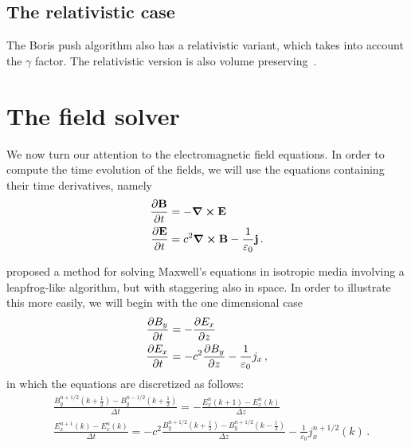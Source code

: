 \documentclass[12pt, class=report, crop=false]{standalone}
\begin{document}
\subsection{The relativistic case}

The Boris push algorithm also has a relativistic variant, which takes into account
the \(\gamma\) factor. The relativistic version is also volume
preserving~\autocite{higuera_structurepreservingsecondorder_2017}.

\section{The field solver}

We now turn our attention to the electromagnetic field equations. In order to
compute the time evolution of the fields, we will use the equations containing
their time derivatives, namely
\begin{align}
  \pdv{\vb{B}}{t} & = - \curl{\vb{E}} \label{eq:faraday-law-for-yee} \\
  \pdv{\vb{E}}{t} & = c^2 \curl{\vb{B}} - \frac{1}{\varepsilon_0} \vb{j} \label{eq:ampere-law-for-yee}\,.
\end{align}

\Textcite{kaneyee_numericalsolution_1966} proposed a method for solving Maxwell's
equations in isotropic media involving a leapfrog-like algorithm, but with
staggering also in space. In order to illustrate this more easily, we will begin
with the one dimensional case
\begin{align*}
  \pdv{B_y}{t} & = - \pdv{E_x}{z} \\
  \pdv{E_x}{t} & = -c^2 \pdv{B_y}{z} - \frac{1}{\varepsilon_0} j_x \,,
\end{align*}
in which the equations are discretized as follows:
\begin{subequations}%
\label{eq:yee-1d}
\begin{align}
    &\frac{B_y^{n+1/2}(k+\frac{1}{2}) - B_y^{n-1/2}(k+\frac{1}{2})}{\Delta t} =
    - \frac{E_x^n(k+1) - E_x^n(k)}{\Delta z} \label{eq:yee-1d-faraday} \\
    &\frac{E_x^{n+1}(k) - E_x^{n}(k)}{\Delta t} =
    -c^2 \frac{B_y^{n+1/2}(k+\frac{1}{2}) - B_y^{n+1/2}(k-\frac{1}{2})}{\Delta z}
    -\frac{1}{\varepsilon_0} j_x^{n+1/2}(k) \label{eq:yee-1d-ampere} \,.
\end{align}
\end{subequations}
\end{document}
